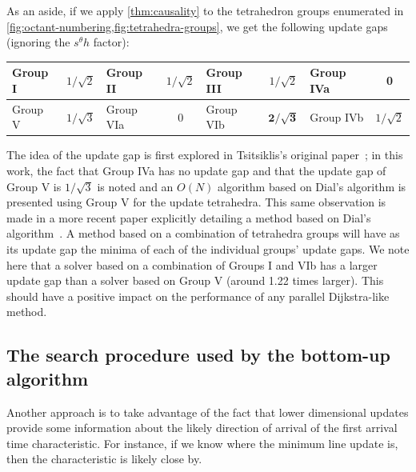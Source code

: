 \documentclass[eikonal.tex]{subfiles}
\begin{document}
As an aside, if we apply \cref{thm:causality} to the tetrahedron
groups enumerated in
\cref{fig:octant-numbering,fig:tetrahedra-groups}, we get the
following update gaps (ignoring the $s^\theta h$ factor):
\vspace{0.5em}
\begin{center}
  \begin{tabular}{lc|lc|lc|lc}
    Group I & $1/\sqrt{2}$ & Group II & $1/\sqrt{2}$ & Group III & $1/\sqrt{2}$ & Group IVa & 0 \\
    \midrule
    Group V & $1/\sqrt{3}$ & Group VIa & 0 & Group VIb & $\boldsymbol{2/\sqrt{3}}$ & Group IVb & $1/\sqrt{2}$
  \end{tabular}
\end{center}
\vspace{0.5em} The idea of the update gap is first explored in
Tsitsiklis's original paper~\cite{tsitsiklis1995efficient}; in this
work, the fact that Group IVa has no update gap and that the update
gap of Group V is $1/\sqrt{3}$ is noted and an $O(N)$ algorithm based
on Dial's algorithm is presented using Group V for the update
tetrahedra. This same observation is made in a more recent paper
explicitly detailing a method based on Dial's
algorithm~\cite{kim2001calo}. A method based on a combination of
tetrahedra groups will have as its update gap the minima of each of
the individual groups' update gaps. We note here that a solver based
on a combination of Groups I and VIb has a larger update gap than a
solver based on Group V (around 1.22 times larger). This should have a
positive impact on the performance of any parallel Dijkstra-like
method.

\subsection{The search procedure used by the bottom-up
  algorithm}\label{ssec:bottom-up-search}

Another approach is to take advantage of the fact that lower
dimensional updates provide some information about the likely
direction of arrival of the first arrival time characteristic. For
instance, if we know where the minimum line update is, then the
characteristic is likely close by.
\end{document}

